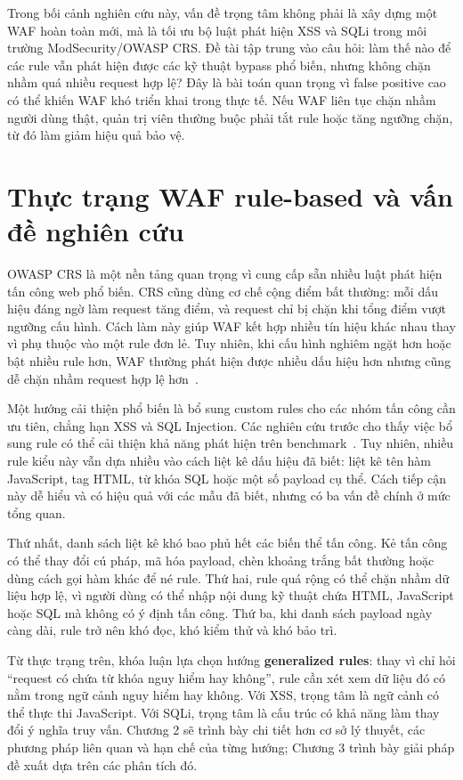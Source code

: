 Trong bối cảnh nghiên cứu này, vấn đề trọng tâm không phải là xây dựng một WAF hoàn toàn mới, mà là tối ưu bộ luật phát hiện XSS và SQLi trong môi trường ModSecurity/OWASP CRS. Đề tài tập trung vào câu hỏi: làm thế nào để các rule vẫn phát hiện được các kỹ thuật bypass phổ biến, nhưng không chặn nhầm quá nhiều request hợp lệ? Đây là bài toán quan trọng vì false positive cao có thể khiến WAF khó triển khai trong thực tế. Nếu WAF liên tục chặn nhầm người dùng thật, quản trị viên thường buộc phải tắt rule hoặc tăng ngưỡng chặn, từ đó làm giảm hiệu quả bảo vệ.

\section{Thực trạng WAF rule-based và vấn đề nghiên cứu}
\label{sec:problem-overview}

OWASP CRS là một nền tảng quan trọng vì cung cấp sẵn nhiều luật phát hiện tấn công web phổ biến. CRS cũng dùng cơ chế cộng điểm bất thường: mỗi dấu hiệu đáng ngờ làm request tăng điểm, và request chỉ bị chặn khi tổng điểm vượt ngưỡng cấu hình. Cách làm này giúp WAF kết hợp nhiều tín hiệu khác nhau thay vì phụ thuộc vào một rule đơn lẻ. Tuy nhiên, khi cấu hình nghiêm ngặt hơn hoặc bật nhiều rule hơn, WAF thường phát hiện được nhiều dấu hiệu hơn nhưng cũng dễ chặn nhầm request hợp lệ hơn~\cite{owasp-crs-annotated,paranoia-levels-study,waf-benchmark-2024}.

Một hướng cải thiện phổ biến là bổ sung custom rules cho các nhóm tấn công cần ưu tiên, chẳng hạn XSS và SQL Injection. Các nghiên cứu trước cho thấy việc bổ sung rule có thể cải thiện khả năng phát hiện trên benchmark~\cite{researcher-group-2025}. Tuy nhiên, nhiều rule kiểu này vẫn dựa nhiều vào cách liệt kê dấu hiệu đã biết: liệt kê tên hàm JavaScript, tag HTML, từ khóa SQL hoặc một số payload cụ thể. Cách tiếp cận này dễ hiểu và có hiệu quả với các mẫu đã biết, nhưng có ba vấn đề chính ở mức tổng quan.

Thứ nhất, danh sách liệt kê khó bao phủ hết các biến thể tấn công. Kẻ tấn công có thể thay đổi cú pháp, mã hóa payload, chèn khoảng trắng bất thường hoặc dùng cách gọi hàm khác để né rule. Thứ hai, rule quá rộng có thể chặn nhầm dữ liệu hợp lệ, vì người dùng có thể nhập nội dung kỹ thuật chứa HTML, JavaScript hoặc SQL mà không có ý định tấn công. Thứ ba, khi danh sách payload ngày càng dài, rule trở nên khó đọc, khó kiểm thử và khó bảo trì.

Từ thực trạng trên, khóa luận lựa chọn hướng \textbf{generalized rules}: thay vì chỉ hỏi ``request có chứa từ khóa nguy hiểm hay không'', rule cần xét xem dữ liệu đó có nằm trong ngữ cảnh nguy hiểm hay không. Với XSS, trọng tâm là ngữ cảnh có thể thực thi JavaScript. Với SQLi, trọng tâm là cấu trúc có khả năng làm thay đổi ý nghĩa truy vấn. Chương 2 sẽ trình bày chi tiết hơn cơ sở lý thuyết, các phương pháp liên quan và hạn chế của từng hướng; Chương 3 trình bày giải pháp đề xuất dựa trên các phân tích đó.


